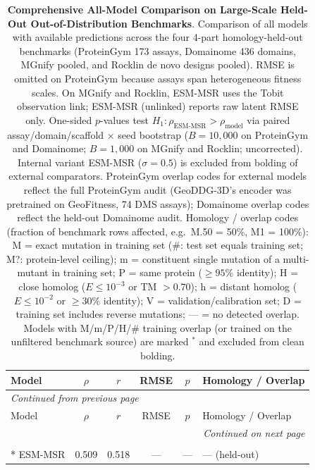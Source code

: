 {
\scriptsize
\setlength{\tabcolsep}{4pt}
\begin{longtable}{lccccl}
\caption{\textbf{Comprehensive All-Model Comparison on Large-Scale Held-Out Out-of-Distribution Benchmarks}. Comparison of all models with available predictions across the four 4-part homology-held-out benchmarks (ProteinGym 173 assays, Domainome 436 domains, MGnify pooled, and Rocklin de novo designs pooled). RMSE is omitted on ProteinGym because assays span heterogeneous fitness scales. On MGnify and Rocklin, ESM-MSR uses the Tobit observation link; ESM-MSR (unlinked) reports raw latent RMSE only. One-sided $p$-values test $H_1\colon \rho_{\text{ESM-MSR}} > \rho_{\text{model}}$ via paired assay/domain/scaffold $\times$ seed bootstrap ($B=10{,}000$ on ProteinGym and Domainome; $B=1{,}000$ on MGnify and Rocklin; uncorrected). Internal variant ESM-MSR ($\sigma=0.5$) is excluded from bolding of external comparators. ProteinGym overlap codes for external models reflect the full ProteinGym audit (GeoDDG-3D's encoder was pretrained on GeoFitness, 74 DMS assays); Domainome overlap codes reflect the held-out Domainome audit. Homology / overlap codes (fraction of benchmark rows affected, e.g.\ M.50 = 50\%, M1 = 100\%): M = exact mutation in training set (\#: test set equals training set; M?: protein-level ceiling); m = constituent single mutation of a multi-mutant in training set; P = same protein ($\ge 95\%$ identity); H = close homolog ($E\le 10^{-3}$ or TM $>0.70$); h = distant homolog ($E\le 10^{-2}$ or $\ge 30\%$ identity); V = validation/calibration set; D = training set includes reverse mutations; --- = no detected overlap. Models with M/m/P/H/\# training overlap (or trained on the unfiltered benchmark source) are marked $^*$ and excluded from clean bolding.}\label{tab:si_heldout_ood} \\
\toprule
Model & $\rho$ & $r$ & RMSE & $p$ & Homology / Overlap \\
\midrule
\endfirsthead
\multicolumn{6}{l}{\textit{Continued from previous page}} \\
\toprule
Model & $\rho$ & $r$ & RMSE & $p$ & Homology / Overlap \\
\midrule
\endhead
\midrule
\multicolumn{6}{r}{\textit{Continued on next page}} \\
\endfoot
\bottomrule
\endlastfoot
\multicolumn{6}{l}{\textbf{ProteinGym (173 held-out DMS assays; $n=2{,}351{,}490$; category-weighted macro average)}} \\*
\midrule
ESM-MSR & 0.509 & 0.518 & --- & --- & --- (held-out) \\

\end{longtable}}
